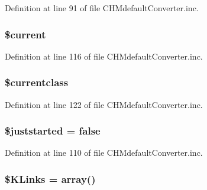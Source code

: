 \-Definition at line 91 of file \-C\-H\-Mdefault\-Converter.\-inc.

\hypertarget{class_c_h_mdefault_converter_a2c4c58e377f6c66ca38c8ea97666fc5e}{
\subsubsection[{\$current}]{\setlength{\rightskip}{0pt plus 5cm}\$current}}\label{class_c_h_mdefault_converter_a2c4c58e377f6c66ca38c8ea97666fc5e}


\-Definition at line 116 of file \-C\-H\-Mdefault\-Converter.\-inc.

\hypertarget{class_c_h_mdefault_converter_a14f3ccc5fc24cdb94ee022a77ef69c4d}{
\subsubsection[{\$currentclass}]{\setlength{\rightskip}{0pt plus 5cm}\$currentclass}}\label{class_c_h_mdefault_converter_a14f3ccc5fc24cdb94ee022a77ef69c4d}


\-Definition at line 122 of file \-C\-H\-Mdefault\-Converter.\-inc.

\hypertarget{class_c_h_mdefault_converter_acb00e2d25525278b0592bfffe53bc4b6}{
\subsubsection[{\$juststarted}]{\setlength{\rightskip}{0pt plus 5cm}\$juststarted = false}}\label{class_c_h_mdefault_converter_acb00e2d25525278b0592bfffe53bc4b6}


\-Definition at line 110 of file \-C\-H\-Mdefault\-Converter.\-inc.

\hypertarget{class_c_h_mdefault_converter_ad9819bdc26ee59da811d4fb7d012c532}{
\subsubsection[{\$\-K\-Links}]{\setlength{\rightskip}{0pt plus 5cm}\$\-K\-Links = array()}}\label{class_c_h_mdefault_converter_ad9819bdc26ee59da811d4fb7d012c532}


